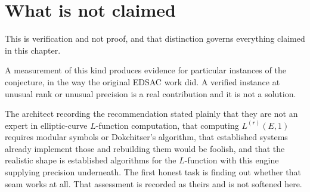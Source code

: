 \section{What is not claimed}

This is verification and not proof, and that distinction governs everything claimed in this
chapter.

A measurement of this kind produces evidence for particular instances of the conjecture, in the way
the original EDSAC work did. A verified instance at unusual rank or unusual precision is a real
contribution and it is not a solution.

The architect recording the recommendation stated plainly that they are not an expert in
elliptic-curve $L$-function computation, that computing $L^{(r)}(E,1)$ requires modular symbols or
Dokchitser's algorithm, that established systems already implement those and rebuilding them would
be foolish, and that the realistic shape is established algorithms for the $L$-function with this
engine supplying precision underneath. The first honest task is finding out whether that seam works
at all. That assessment is recorded as theirs and is not softened here.
